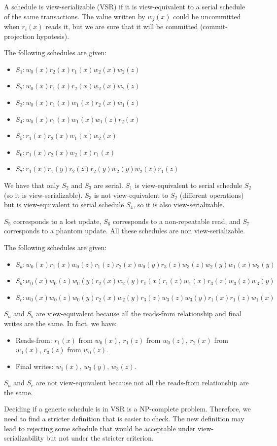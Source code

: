 \documentclass[12pt, a4paper]{report}
\begin{document}
    A schedule is view-serializable (VSR) if it is view-equivalent to a serial schedule of the same transactions. The value written by $w_j(x)$ could be uncommitted when $r_i(x)$ 
    reads it, but we are sure that it will be committed (commit-projection hypotesis).
    \begin{example}
        The following schedules are given:
        \begin{itemize}
            \item $S_1: w_0(x) r_2(x) r_1(x) w_2(x) w_2(z)$
            \item $S_2: w_0(x) r_1(x) r_2(x) w_2(x) w_2(z)$
            \item $S_3: w_0(x) r_1(x) w_1(x) r_2(x) w_1(z)$
            \item $S_4: w_0(x) r_1(x) w_1(x) w_1(z) r_2(x)$
            \item $S_5: r_1(x) r_2(x) w_1(x) w_2(x)$
            \item $S_6: r_1(x) r_2(x) w_2(x) r_1(x)$
            \item $S_7: r_1(x) r_1(y) r_2(z) r_2(y) w_2(y) w_2(z) r_1(z)$
        \end{itemize}
        We have that only $S_2$ and $S_3$ are serial. $S_1$ is view-equivalent to serial schedule $S_2$ (so it is view-serializable). 
        $S_3$ is not view-equivalent to $S_2$ (different operations) but is view-equivalent to serial schedule $S_4$, so it is also view-serializable. 

        $S_5$ corresponds to a lost update, $S_6$ corresponds to a non-repeatable read, and $S_7$ corresponds to a phantom update. All these schedules are non view-serializable. 
        
        The following schedules are given:
        \begin{itemize}
            \item $S_a: w_0(x) r_1(x) w_0(z) r_1(z) r_2(x) w_0(y) r_3(z) w_3(z) w_2(y) w_1(x) w_3(y)$
            \item $S_b: w_0(x) w_0(z) w_0(y) r_2(x) w_2(y) r_1(x) r_1(z) w_1(x) r_3(z) w_3(z) w_3(y)$
            \item $S_c: w_0(x) w_0(z) w_0(y) r_2(x) w_2(y) r_3(z) w_3(z) w_3(y) r_1(x) r_1(z) w_1(x)$
        \end{itemize}
        $S_a$ and $S_b$ are view-equivalent because all the reads-from relationship and final writes are the same. In fact, we have: 
        \begin{itemize}
            \item Reads-from: $r_1(x)$ from $w_0(x)$, $r_1(z)$ from $w_0(z)$, $r_2(x)$ from $w_0(x)$, $r_3(z)$ from $w_0(z)$.
            \item Final writes: $w_1(x)$, $w_3(y)$, $w_3(z)$.
        \end{itemize}
        $S_a$ and $S_c$ are not view-equivalent because not all the reads-from relationship are the same. 
    \end{example}
    Deciding if a generic schedule is in VSR is a NP-complete problem. Therefore, we need to find a stricter definition that is easier to check. The new definition may lead to 
    rejecting some schedule that would be acceptable under view-serializability but not under the stricter criterion.
    
\end{document}
